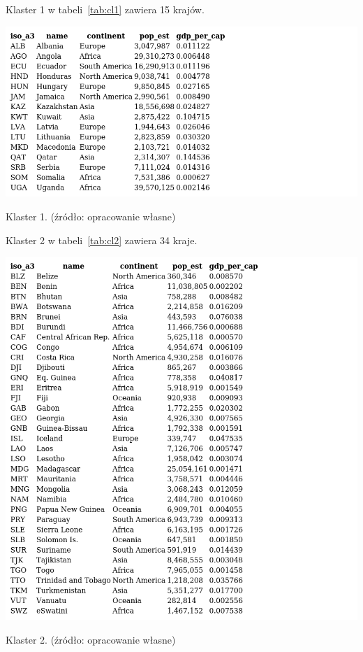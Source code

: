 \documentclass[11pt]{report}
\begin{document}
    Klaster 1 w tabeli~\ref{tab:cl1} zawiera 15 krajów.
    \begin{table}[!htp]
        \centering
        \includegraphics[width=\linewidth]{tables/CLUST/clust1kmeans.png}
        \caption{Klaster 1. (źródło: opracowanie własne)}
        \label{tab:cl1}
    \end{table}

    Klaster 2 w tabeli~\ref{tab:cl2} zawiera 34 kraje.
    \begin{table}[!htp]
        \centering
        \includegraphics[width=\linewidth]{tables/CLUST/clust2kmeans.png}
        \caption{Klaster 2. (źródło: opracowanie własne)}
        \label{tab:cl2}
    \end{table}
\end{document}
